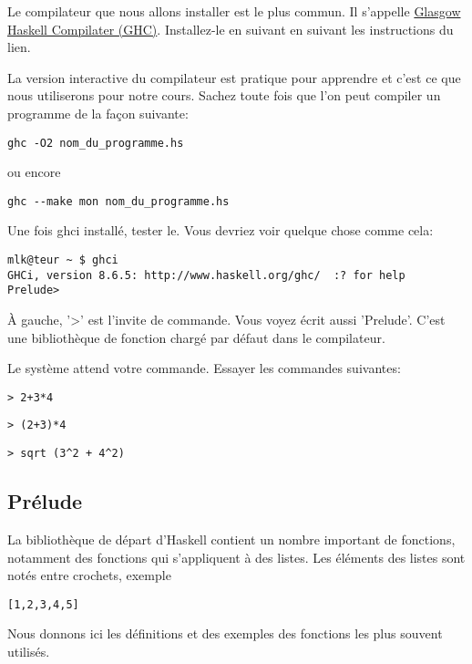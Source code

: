 \documentclass[11pt]{article}
\begin{document}
Le compilateur que nous allons installer est le plus commun.  Il s'appelle \href{https://www.haskell.org/downloads/}{Glasgow Haskell Compilater (GHC)}.  Installez-le en suivant en suivant les instructions du lien.

La version interactive du compilateur est pratique pour apprendre et c'est ce que nous utiliserons pour notre cours.  Sachez toute fois que l'on peut compiler un programme de la façon suivante:
\begin{verbatim}
ghc -O2 nom_du_programme.hs
\end{verbatim}
ou encore 
\begin{verbatim}
ghc --make mon nom_du_programme.hs
\end{verbatim}


Une fois ghci installé, tester le.  Vous devriez voir quelque chose comme cela:
\begin{verbatim}
mlk@teur ~ $ ghci
GHCi, version 8.6.5: http://www.haskell.org/ghc/  :? for help
Prelude> 
\end{verbatim}

À gauche, '>' est l'invite de commande.   Vous voyez écrit aussi 'Prelude'.  C'est une bibliothèque de fonction chargé par défaut dans le compilateur.

Le système attend votre commande.  Essayer les commandes suivantes:

\begin{verbatim}
> 2+3*4
\end{verbatim}

\begin{verbatim}
> (2+3)*4
\end{verbatim}

\begin{verbatim}
> sqrt (3^2 + 4^2)
\end{verbatim}

\subsection{Prélude}
\label{sec:orgf087ef9}
La bibliothèque de départ d'Haskell contient un nombre important de fonctions, notamment des fonctions qui s'appliquent à des listes.   Les éléments des listes sont notés entre crochets, exemple
\begin{verbatim}
[1,2,3,4,5]
\end{verbatim}

Nous donnons ici les définitions et des exemples des fonctions les plus souvent utilisés.
\end{document}
